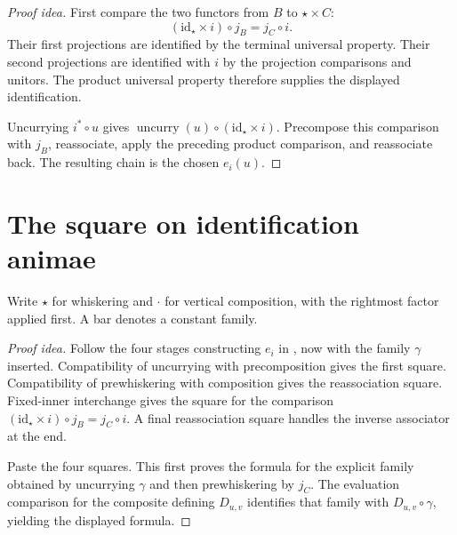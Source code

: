 \documentclass[11pt]{article}
\begin{document}
\begin{proof}[Proof idea]
First compare the two functors from $B$ to $\star\times C$:
\[
 (\mathrm{id}_{\star}\times i)\circ j_B=j_C\circ i.
\]
Their first projections are identified by the terminal universal
property. Their second projections are identified with $i$ by the
projection comparisons and unitors. The product universal property
therefore supplies the displayed identification.

Uncurrying $i^*\circ u$ gives
$\operatorname{uncurry}(u)\circ(\mathrm{id}_{\star}\times i)$.
Precompose this comparison with $j_B$, reassociate, apply the preceding
product comparison, and reassociate back. The resulting chain is the
chosen $e_i(u)$.
\end{proof}

\section*{The square on identification animae}

Write $\star$ for whiskering and $\cdot$ for vertical composition,
with the rightmost factor applied first. A bar denotes a constant family.

\begin{proof}[Proof idea]
Follow the four stages constructing $e_i$ in
, now with the family
$\gamma$ inserted. Compatibility of uncurrying with precomposition gives
the first square. Compatibility of prewhiskering with composition gives
the reassociation square. Fixed-inner interchange gives the square for
the comparison $(\mathrm{id}_{\star}\times i)\circ j_B=j_C\circ i$.
A final reassociation square handles the inverse associator at the end.

Paste the four squares. This first proves the formula for the explicit
family obtained by uncurrying $\gamma$ and then prewhiskering by $j_C$.
The evaluation comparison for the composite defining $D_{u,v}$ identifies
that family with $D_{u,v}\circ\gamma$, yielding the displayed formula.
\end{proof}
\end{document}
